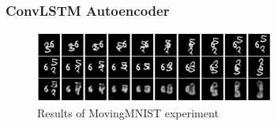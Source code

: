   \begin{frame}
   \frametitle{ConvLSTM Autoencoder}
   
   \begin{figure}[H]
    \includegraphics[width=0.7\textwidth]{../Images/shi_results_mnist.png}
    \centering
    \caption{Results of MovingMNIST experiment \citep{Srivastava2015}}
    \label{fig:lstm_architecture}
   \end{figure}  
  
  \end{frame}
 

